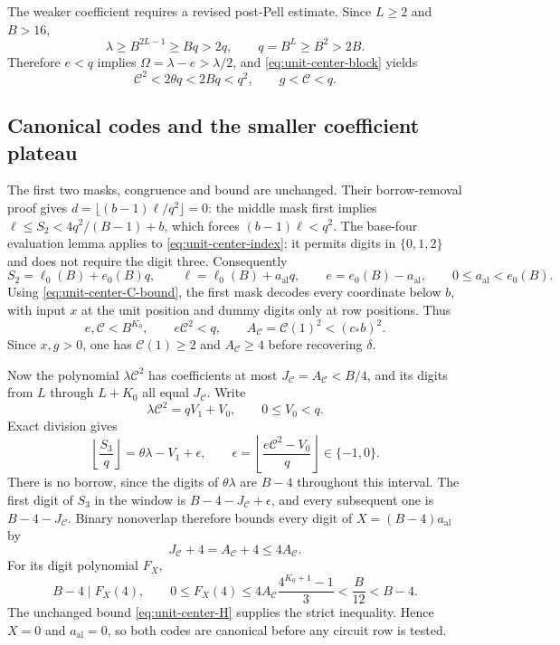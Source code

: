 The weaker coefficient requires a revised post-Pell estimate. Since
$L\ge2$ and $B>16$,
\[
 \lambda\ge B^{2L-1}\ge Bq>2q,
 \qquad q=B^L\ge B^2>2B.
\]
Therefore $e<q$ implies $\Omega=\lambda-e>\lambda/2$, and
\eqref{eq:unit-center-block} yields
\begin{equation}\label{eq:unit-center-C-bound}
 \mathcal C^2<2\theta q<2Bq<q^2,
 \qquad g<\mathcal C<q.
\end{equation}

\subsection{Canonical codes and the smaller coefficient plateau}

The first two masks, congruence and bound are unchanged. Their
borrow-removal proof gives $d=\lfloor(b-1)\ell/q^2\rfloor=0$:
the middle mask first implies
$\ell\le S_2<4q^2/(B-1)+b$, which forces $(b-1)\ell<q^2$.
The base-four evaluation lemma applies to
\eqref{eq:unit-center-index}; it permits digits in $\{0,1,2\}$
and does not require the digit three. Consequently
\[
 S_2=\ell_0(B)+e_0(B)q,\qquad
 \ell=\ell_0(B)+a_{\mathrm{al}}q,\qquad
 e=e_0(B)-a_{\mathrm{al}},\qquad
 0\le a_{\mathrm{al}}<e_0(B).
\]
Using \eqref{eq:unit-center-C-bound}, the first mask decodes every
coordinate below $b$, with input $x$ at the unit position and dummy
digits only at row positions. Thus
\[
 e,\mathcal C<B^{K_0},\qquad e\mathcal C^2<q,
 \qquad A_{\mathcal C}=\mathcal C(1)^2<(c_*b)^2.
\]
Since $x,g>0$, one has $\mathcal C(1)\ge2$ and
$A_{\mathcal C}\ge4$ before recovering $\delta$.

Now the polynomial $\lambda\mathcal C^2$ has coefficients at most
$J_{\mathcal C}=A_{\mathcal C}<B/4$, and its digits from $L$
through $L+K_0$ all equal $J_{\mathcal C}$. Write
\[
 \lambda\mathcal C^2=qV_1+V_0,\qquad0\le V_0<q.
\]
Exact division gives
\[
 \left\lfloor\frac{S_3}{q}\right\rfloor
 =\theta\lambda-V_1+\epsilon,\qquad
 \epsilon=\left\lfloor
 \frac{e\mathcal C^2-V_0}{q}\right\rfloor\in\{-1,0\}.
\]
There is no borrow, since the digits of $\theta\lambda$ are $B-4$
throughout this interval. The first digit of $S_3$ in the window is
$B-4-J_{\mathcal C}+\epsilon$, and every subsequent one is
$B-4-J_{\mathcal C}$. Binary nonoverlap therefore bounds every
digit of $X=(B-4)a_{\mathrm{al}}$ by
\[
 J_{\mathcal C}+4=A_{\mathcal C}+4\le4A_{\mathcal C}.
\]
For its digit polynomial $F_X$,
\[
 B-4\mid F_X(4),\qquad
 0\le F_X(4)\le
 4A_{\mathcal C}\frac{4^{K_0+1}-1}{3}<\frac B{12}<B-4.
\]
The unchanged bound \eqref{eq:unit-center-H} supplies the strict
inequality. Hence $X=0$ and $a_{\mathrm{al}}=0$, so both codes
are canonical before any circuit row is tested.

